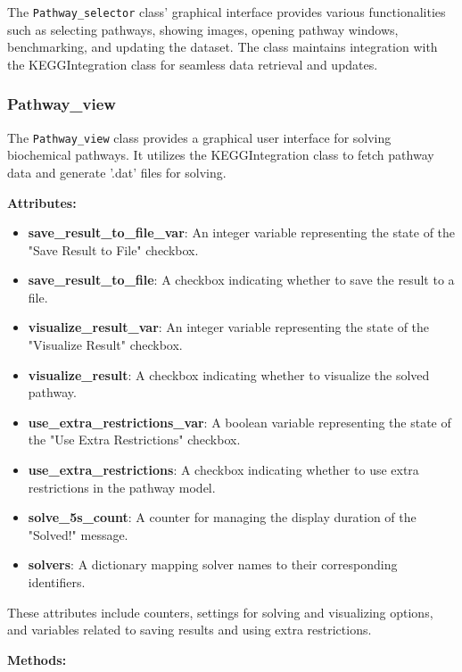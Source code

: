 The \texttt{Pathway\_selector} class' graphical interface provides various functionalities such as selecting pathways, showing images, opening pathway windows, benchmarking, and updating the dataset. The class maintains integration with the KEGGIntegration class for seamless data retrieval and updates.

\subsubsection{Pathway\_view}

The \texttt{Pathway\_view} class provides a graphical user interface for solving biochemical pathways. It utilizes the KEGGIntegration class to fetch pathway data and generate '.dat' files for solving.

\textbf{Attributes:}

\begin{itemize}
    \item \textbf{save\_result\_to\_file\_var}: An integer variable representing the state of the "Save Result to File" checkbox.
    \item \textbf{save\_result\_to\_file}: A checkbox indicating whether to save the result to a file.
    \item \textbf{visualize\_result\_var}: An integer variable representing the state of the "Visualize Result" checkbox.
    \item \textbf{visualize\_result}: A checkbox indicating whether to visualize the solved pathway.
    \item \textbf{use\_extra\_restrictions\_var}: A boolean variable representing the state of the "Use Extra Restrictions" checkbox.
    \item \textbf{use\_extra\_restrictions}: A checkbox indicating whether to use extra restrictions in the pathway model.
    \item \textbf{solve\_5s\_count}: A counter for managing the display duration of the "Solved!" message.
    \item \textbf{solvers}: A dictionary mapping solver names to their corresponding identifiers.
\end{itemize}

These attributes include counters, settings for solving and visualizing options, and variables related to saving results and using extra restrictions.

\textbf{Methods:}

